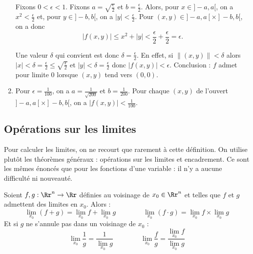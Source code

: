 \documentclass[11pt, class=report,crop=false]{standalone}
\begin{document}
\begin{exemple}
\begin{enumerate}
  Fixons $0<\epsilon<1$. Fixons $a = \sqrt{\frac{\epsilon}{2}}$ et $b=\frac\epsilon2$. Alors, pour $x \in {}]-a,a[$, on a $x^2 < \frac\epsilon2$ et, pour $y \in {}]-b,b[$, on a $|y| < \frac\epsilon2$. Pour $(x,y) \in {}]-a,a[ \times  {}]-b,b[$, on a donc 
  $$\big| f(x,y) \big| \le x^2 +|y| < \frac\epsilon2 + \frac\epsilon2 = \epsilon.$$
  
  Une valeur $\delta$ qui convient est donc $\delta = \frac\epsilon2$. En effet,
  si $\| (x,y) \| < \delta$ alors $|x| < \delta = \frac\epsilon2 \le  \sqrt{\frac{\epsilon}{2}} $ 
  et $|y| < \delta = \frac\epsilon2$ donc $|f(x,y)| < \epsilon$. Conclusion : $f$ admet pour limite $0$ lorsque $(x,y)$ tend vers $(0,0)$.
  
  
  
  \item Pour $\epsilon = \frac{1}{100}$, on a $a = \frac{1}{\sqrt{200}}$ et $b=\frac{1}{200}$. Pour chaque $(x,y)$ de l'ouvert $]-a,a[ \times {}]-b,b[$, on a $|f(x,y)| < \frac{1}{100}$.
\end{enumerate}
  
\end{exemple}

\subsection{Opérations sur les limites}


Pour calculer les limites, on ne recourt que rarement à cette définition. 
On utilise plutôt les théorèmes généraux : opérations sur les limites et encadrement. 
Ce sont les mêmes énoncés que pour les fonctions d'une variable : il n'y a aucune difficulté ni nouveauté. 


\begin{proposition}
Soient $f,g:\Rr^n\to \Rr$ définies au voisinage de $x_0 \in \Rr^n$ et telles que $f$ et $g$ admettent des limites en $x_0$. Alors :
$$\lim_{x_0}(f+g)=\lim _{x_0}f+\lim _{x_0}g 
\qquad  \qquad 
\lim _{x_0}(f \cdot g)=\lim _{x_0}f\times \lim _{x_0}g$$
Et si $g$ ne s'annule pas dans un voisinage de $x_0$ :
$$\lim _{x_0}\frac{1}{g}=\frac{1}{\lim _{x_0}g} 
\qquad  \qquad 
\displaystyle \lim _{x_0}\frac{f}{g}=\frac{\lim _{x_0}f}{\lim _{x_0}g}
$$
\end{proposition}
\end{document}
